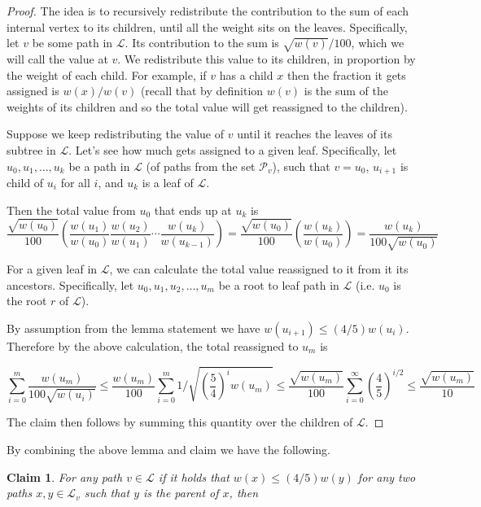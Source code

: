 \documentclass[11pt]{article}
\newtheorem{claim}[theorem]{Claim}
\theoremstyle{definition}
\newcommand{\pth}[2][\!]{#1\left({#2}\right)}
\begin{document}
{\begin{proof}
The idea is to recursively redistribute the contribution to the sum of each internal vertex to its children, 
until all the weight sits on the leaves.  Specifically, let $v$ be some path in $\mathcal{L}$.  Its 
contribution to the sum is $\sqrt{w(v)}/100$, which we will call the value at $v$.  We redistribute this 
value to its children, in proportion by the weight of each child.  For example, if $v$ has a child $x$ then 
the fraction it gets assigned is $w(x)/w(v)$ (recall that by definition $w(v)$ is the sum of the weights of 
its children and so the total value will get reassigned to the children).

Suppose we keep redistributing the value of $v$ until it reaches the leaves of its subtree in $\mathcal{L}$.  
Let's see how much gets assigned to a given leaf.  Specifically, let $u_0, u_1, \ldots, u_k$ 
be a path in $\mathcal{L}$ (of paths from the set $\mathcal{P}_v$), such that $v=u_0$, $u_{i+1}$ 
is child of $u_i$ for all $i$, and $u_k$ is a leaf of $\mathcal{L}$.  

Then the total value from $u_0$ that ends up at $u_k$ is 
\[
\frac{\sqrt{w(u_0)}}{100} \pth{ \frac{w(u_1)}{w(u_0)} \frac{w(u_2)}{w(u_1)} \cdots \frac{w(u_k)}{w(u_{k-1})} }
= \frac{\sqrt{w(u_0)}}{100} \pth{ \frac{w(u_k)}{w(u_0)} } = \frac{w(u_k)}{100\sqrt{w(u_0)}}
\]

For a given leaf in $\mathcal{L}$, we can calculate the total value reassigned to it from it its ancestors.
Specifically, let $u_0, u_1, u_2, \dots, u_m$ be a root to leaf path in $\mathcal{L}$ 
(i.e. $u_0$ is the root $r$ of $\mathcal{L}$).

By assumption from the lemma statement we have $w(u_{i+1})\leq (4/5) w(u_i)$.  Therefore by the above calculation, 
the total reassigned to $u_m$ is 

\[
 \sum_{i=0}^m \frac{w(u_m)}{100\sqrt{w(u_i)}} \leq \frac{w(u_m)}{100} \sum_{i=0}^m 1 \Big/ \sqrt{\pth{\frac{5}{4}}^iw(u_m)} 
 \leq \frac{\sqrt{w(u_m)}}{100} \sum_{i=0}^{\infty} \pth{\frac{4}{5}}^{i/2} \leq \frac{\sqrt{w(u_m)}}{10}
\]

The claim then follows by summing this quantity over the children of $\mathcal{L}$.
\end{proof}

By combining the above lemma and claim we have the following.

\begin{claim}
For any path $v\in \mathcal{L}$ if it holds that 
$w(x)\leq (4/5) w(y)$ for any two paths $x,y\in \mathcal{L}_v$ such that $y$ is the parent of $x$, then 


\end{claim}}
\end{document}

